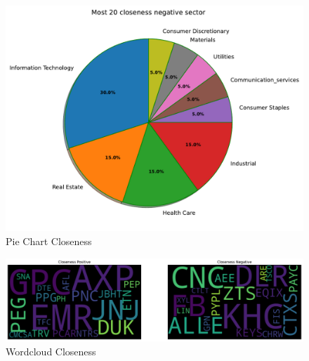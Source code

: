 \documentclass[sigchi]{acmart}
\begin{document}
\begin{figure}[h]
	\centering
	\includegraphics[width=0.65\linewidth]{plot/pie_clos_neg.pdf}
	\caption{Pie Chart Closeness}
\end{figure}
\begin{figure}[h]
	\centering
	\includegraphics[width= \linewidth]{plot/wordcloud_closeness.pdf}
	\caption{Wordcloud Closeness}
\end{figure}
\end{document}
